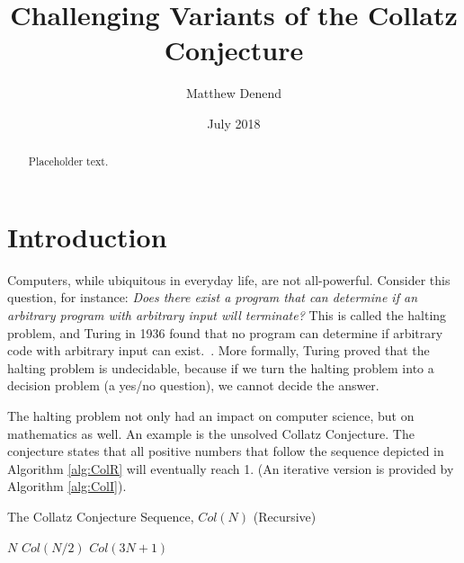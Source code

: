 \documentclass[12pt]{article}
\title{Challenging Variants of the Collatz Conjecture}%
\author{Matthew Denend}
\date{July 2018}
\newcommand{\Mod}[1]{\ (\mathrm{mod}\ #1)}
\theoremstyle{definition}
\begin{document}
\maketitle

\begin{abstract}
    Placeholder text.
\end{abstract}

\section{Introduction} \label{sec:introduction}
Computers, while ubiquitous in everyday life, are not all-powerful. Consider this question, for instance: \textit{Does there exist a program that can determine if an arbitrary program with arbitrary input will terminate?} This is called the halting problem, and Turing in 1936 found that no program can determine if arbitrary code with arbitrary input can exist.~\cite{Turing1936}. More formally, Turing proved that the halting problem is undecidable, because if we turn the halting problem into a decision problem (a yes/no question), we cannot decide the answer.\par
The halting problem not only had an impact on computer science, but on mathematics as well. An example is the unsolved Collatz Conjecture. The conjecture states that all positive numbers that follow the sequence depicted in Algorithm \ref{alg:ColR} will eventually reach 1. (An iterative version is provided by Algorithm \ref{alg:ColI}).
\begin{algorithm} 
\caption{The Collatz Conjecture Sequence, $Col(N)$ (Recursive)}
\label{alg:ColR} 
\begin{algorithmic}[1]
     \Return $N$ 
    \EndIf
    \If {$N \equiv 0 \Mod{2}$} \Return $Col(N/2)$
    \EndIf
    \State \Return $Col(3N + 1)$ 
\end{algorithmic}
\end{algorithm}
\end{document}
